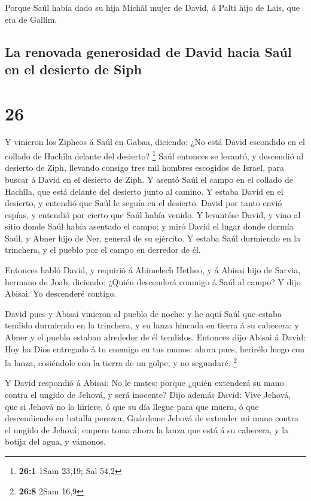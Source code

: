  Porque Saúl había dado su hija Michâl mujer de David, á
Palti hijo de Lais, que era de Gallim.

\hypertarget{la-renovada-generosidad-de-david-hacia-sauxfal-en-el-desierto-de-siph}{%
\subsection{La renovada generosidad de David hacia Saúl en el desierto
de
Siph}\label{la-renovada-generosidad-de-david-hacia-sauxfal-en-el-desierto-de-siph}}

\hypertarget{section-25}{%
\section{26}\label{section-25}}

 Y vinieron los Zipheos á Saúl en Gabaa, diciendo: ¿No
está David escondido en el collado de Hachîla delante del desierto?
\footnote{\textbf{26:1} 1Sam 23,19; Sal 54,2}  Saúl
entonces se levantó, y descendió al desierto de Ziph, llevando consigo
tres mil hombres escogidos de Israel, para buscar á David en el desierto
de Ziph.  Y asentó Saúl el campo en el collado de Hachîla,
que está delante del desierto junto al camino. Y estaba David en el
desierto, y entendió que Saúl le seguía en el desierto. 
David por tanto envió espías, y entendió por cierto que Saúl había
venido.  Y levantóse David, y vino al sitio donde Saúl
había asentado el campo; y miró David el lugar donde dormía Saúl, y
Abner hijo de Ner, general de su ejército. Y estaba Saúl durmiendo en la
trinchera, y el pueblo por el campo en derredor de él.

 Entonces habló David, y requirió á Ahimelech Hetheo, y á
Abisai hijo de Sarvia, hermano de Joab, diciendo: ¿Quién descenderá
conmigo á Saúl al campo? Y dijo Abisai: Yo descenderé contigo.

 David pues y Abisai vinieron al pueblo de noche: y he
aquí Saúl que estaba tendido durmiendo en la trinchera, y su lanza
hincada en tierra á su cabecera; y Abner y el pueblo estaban alrededor
de él tendidos.  Entonces dijo Abisai á David: Hoy ha Dios
entregado á tu enemigo en tus manos: ahora pues, herirélo luego con la
lanza, cosiéndole con la tierra de un golpe, y no segundaré. \footnote{\textbf{26:8}
  2Sam 16,9}

 Y David respondió á Abisai: No le mates: porque ¿quién
extenderá su mano contra el ungido de Jehová, y será inocente?
 Dijo además David: Vive Jehová, que si Jehová no lo
hiriere, ó que su día llegue para que muera, ó que descendiendo en
batalla perezca,  Guárdeme Jehová de extender mi mano
contra el ungido de Jehová; empero toma ahora la lanza que está á su
cabecera, y la botija del agua, y vámonos.

